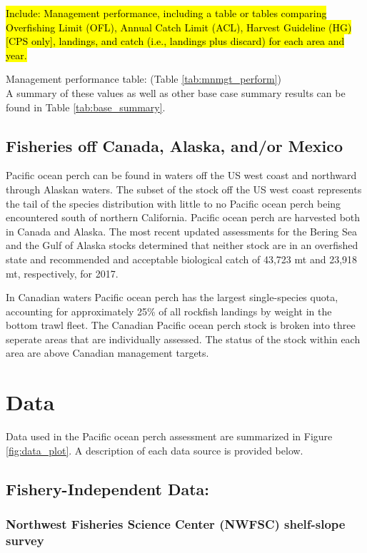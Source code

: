 \documentclass[12pt,]{article}
\begin{document}
\hl{Include: Management performance, including a table or tables comparing 
  Overfishing Limit (OFL), Annual Catch Limit (ACL), Harvest Guideline (HG) 
  [CPS only], landings, and catch (i.e., landings plus discard) for each area and year.}

Management performance table: (Table \ref{tab:mnmgt_perform})\\
A summary of these values as well as other base case summary results can
be found in Table \ref{tab:base_summary}.

\subsection{Fisheries off Canada, Alaska, and/or
Mexico}\label{fisheries-off-canada-alaska-andor-mexico}

Pacific ocean perch can be found in waters off the US west coast and
northward through Alaskan waters. The subset of the stock off the US
west coast represents the tail of the species distribution with little
to no Pacific ocean perch being encountered south of northern
California. Pacific ocean perch are harvested both in Canada and Alaska.
The most recent updated assessments for the Bering Sea and the Gulf of
Alaska stocks determined that neither stock are in an overfished state
and recommended and acceptable biological catch of 43,723 mt and 23,918
mt, respectively, for 2017.

In Canadian waters Pacific ocean perch has the largest single-species
quota, accounting for approximately 25\% of all rockfish landings by
weight in the bottom trawl fleet. The Canadian Pacific ocean perch stock
is broken into three seperate areas that are individually assessed. The
status of the stock within each area are above Canadian management
targets.

\section{Data}\label{data}

Data used in the Pacific ocean perch assessment are summarized in Figure
\ref{fig:data_plot}. A description of each data source is provided
below.

\subsection{Fishery-Independent Data:}\label{fishery-independent-data}

\subsubsection{Northwest Fisheries Science Center (NWFSC) shelf-slope
survey}\label{northwest-fisheries-science-center-nwfsc-shelf-slope-survey}
\end{document}
